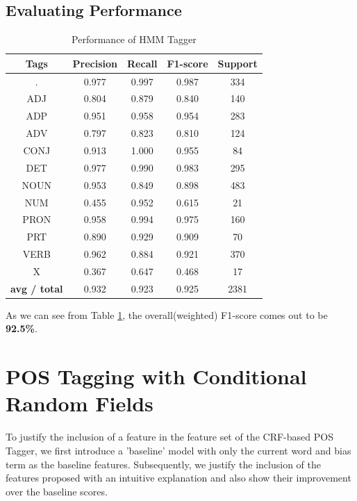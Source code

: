 \documentclass[12pt]{article}
\begin{document}
 \subsection{Evaluating Performance}

\begin{table}[h!]
\begin{center}
    \caption{Performance of HMM Tagger}
    \label{tab:table1}
\begin{tabular}{ c c c c c}
 \textbf{Tags}& \textbf{Precision} & \textbf{Recall} & \textbf{F1-score} & \textbf{Support} \\ 
 \hline
 .  &   0.977  &   0.997  &   0.987  &     334\\  
ADJ &    0.804  &   0.879  &   0.840   &    140\\
ADP &     0.951  &   0.958  &   0.954  &     283\\
ADV  &    0.797  &   0.823  &   0.810  &     124\\
CONJ &     0.913  &   1.000 &    0.955  &      84\\
DET  &    0.977  &   0.990  &   0.983   &    295\\
NOUN &     0.953 &    0.849 &    0.898  &     483\\
NUM  &    0.455  &   0.952  &   0.615  &      21\\
PRON  &    0.958 &    0.994 &    0.975  &     160\\
PRT  &    0.890  &   0.929  &   0.909   &     70\\
VERB &     0.962 &    0.884 &    0.921  &     370\\
X   &   0.367   &  0.647    &    0.468    &    17\\
\hline
\textbf{avg / total}  &     0.932&      0.923 &     0.925  &     2381

\end{tabular}
\end{center}
\end{table}
As we can see from Table \ref{tab:table1}, the overall(weighted) F1-score comes out to be \textbf{92.5\%}.

\section{POS Tagging with Conditional Random Fields}

To justify the inclusion of a feature in the feature set of the CRF-based POS Tagger, we first introduce a 'baseline' model with only the current word and bias term as the baseline features. Subsequently, we justify the inclusion of the features proposed with an intuitive explanation and also show their improvement over the baseline scores.
\end{document}
